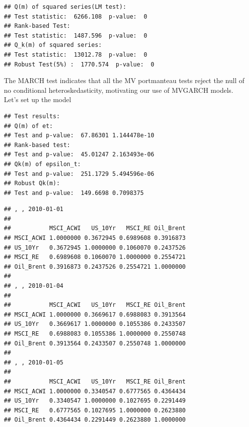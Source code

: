 \documentclass[11pt,preprint, authoryear]{elsarticle}
\numberwithin{equation}{section}
\numberwithin{figure}{section}
\numberwithin{table}{section}
\begin{document}
\pagestyle{fancy}
\chead{}
\rhead{}
\lfoot{}
\lhead{}
\cfoot{}


\headsep 35pt %




\begin{verbatim}
## Q(m) of squared series(LM test):  
## Test statistic:  6266.108  p-value:  0 
## Rank-based Test:  
## Test statistic:  1487.596  p-value:  0 
## Q_k(m) of squared series:  
## Test statistic:  13012.78  p-value:  0 
## Robust Test(5%) :  1770.574  p-value:  0
\end{verbatim}

The MARCH test indicates that all the MV portmanteau tests reject the
null of no conditional heteroskedasticity, motivating our use of MVGARCH
models. Let's set up the model

\begin{verbatim}
## Test results:  
## Q(m) of et: 
## Test and p-value:  67.86301 1.144478e-10 
## Rank-based test: 
## Test and p-value:  45.01247 2.163493e-06 
## Qk(m) of epsilon_t: 
## Test and p-value:  251.1729 5.494596e-06 
## Robust Qk(m):  
## Test and p-value:  149.6698 0.7098375
\end{verbatim}

\begin{verbatim}
## , , 2010-01-01
## 
##           MSCI_ACWI   US_10Yr   MSCI_RE Oil_Brent
## MSCI_ACWI 1.0000000 0.3672945 0.6989608 0.3916873
## US_10Yr   0.3672945 1.0000000 0.1060070 0.2437526
## MSCI_RE   0.6989608 0.1060070 1.0000000 0.2554721
## Oil_Brent 0.3916873 0.2437526 0.2554721 1.0000000
## 
## , , 2010-01-04
## 
##           MSCI_ACWI   US_10Yr   MSCI_RE Oil_Brent
## MSCI_ACWI 1.0000000 0.3669617 0.6988083 0.3913564
## US_10Yr   0.3669617 1.0000000 0.1055386 0.2433507
## MSCI_RE   0.6988083 0.1055386 1.0000000 0.2550748
## Oil_Brent 0.3913564 0.2433507 0.2550748 1.0000000
## 
## , , 2010-01-05
## 
##           MSCI_ACWI   US_10Yr   MSCI_RE Oil_Brent
## MSCI_ACWI 1.0000000 0.3340547 0.6777565 0.4364434
## US_10Yr   0.3340547 1.0000000 0.1027695 0.2291449
## MSCI_RE   0.6777565 0.1027695 1.0000000 0.2623880
## Oil_Brent 0.4364434 0.2291449 0.2623880 1.0000000
\end{verbatim}
\end{document}
